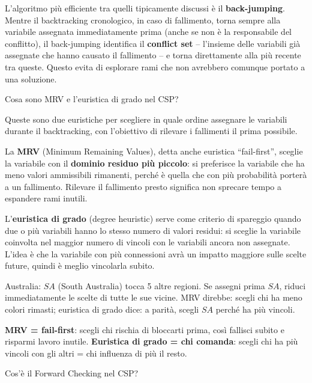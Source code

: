 \documentclass[12pt,a4paper]{article}
\begin{document}
L'algoritmo più efficiente tra quelli tipicamente discussi è il \textbf{back-jumping}. Mentre il backtracking cronologico, in caso di fallimento, torna sempre alla variabile assegnata immediatamente prima (anche se non è la responsabile del conflitto), il back-jumping identifica il \textbf{conflict set} -- l'insieme delle variabili già assegnate che hanno causato il fallimento -- e torna direttamente alla più recente tra queste. Questo evita di esplorare rami che non avrebbero comunque portato a una soluzione.

\begin{domandabox}{Cosa sono MRV e l'euristica di grado nel CSP?}
\end{domandabox}

Queste sono due euristiche per scegliere in quale ordine assegnare le variabili durante il backtracking, con l'obiettivo di rilevare i fallimenti il prima possibile.

La \textbf{MRV} (Minimum Remaining Values), detta anche euristica ``fail-first'', sceglie la variabile con il \textbf{dominio residuo più piccolo}: si preferisce la variabile che ha meno valori ammissibili rimanenti, perché è quella che con più probabilità porterà a un fallimento. Rilevare il fallimento presto significa non sprecare tempo a espandere rami inutili.

L'\textbf{euristica di grado} (degree heuristic) serve come criterio di spareggio quando due o più variabili hanno lo stesso numero di valori residui: si sceglie la variabile coinvolta nel maggior numero di vincoli con le variabili ancora non assegnate. L'idea è che la variabile con più connessioni avrà un impatto maggiore sulle scelte future, quindi è meglio vincolarla subito.

\begin{esempiobox}
Australia: $SA$ (South Australia) tocca 5 altre regioni. Se assegni prima $SA$, riduci immediatamente le scelte di tutte le sue vicine. MRV direbbe: scegli chi ha meno colori rimasti; euristica di grado dice: a parità, scegli $SA$ perché ha più vincoli.
\end{esempiobox}

\begin{ricordabox}
\textbf{MRV = fail-first}: scegli chi rischia di bloccarti prima, così fallisci subito e risparmi lavoro inutile. \textbf{Euristica di grado = chi comanda}: scegli chi ha più vincoli con gli altri = chi influenza di più il resto.
\end{ricordabox}

\begin{domandabox}{Cos'è il Forward Checking nel CSP?}
\end{domandabox}
\end{document}

